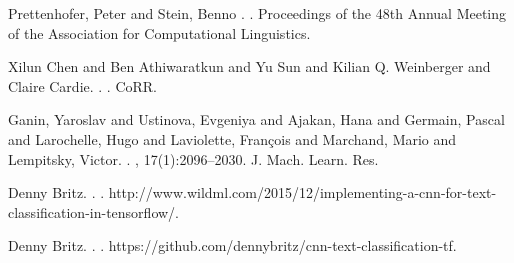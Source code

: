 \documentclass[11pt,a4paper]{article}
\begin{document}
\begin{thebibliography}{}
Prettenhofer, Peter and Stein, Benno
.
.
\newblock Proceedings of the 48th Annual Meeting of the Association for Computational Linguistics.

Xilun Chen and Ben Athiwaratkun and Yu Sun and Kilian Q. Weinberger and Claire Cardie.
.
.
\newblock CoRR.

Ganin, Yaroslav and Ustinova, Evgeniya and Ajakan, Hana and Germain, Pascal and Larochelle, Hugo and Laviolette, Fran\c{c}ois and Marchand, Mario and Lempitsky, Victor.
.
,
  17(1):2096--2030.
\newblock J. Mach. Learn. Res.

Denny Britz.
.
.
\newblock http://www.wildml.com/2015/12/implementing-a-cnn-for-text-classification-in-tensorflow/.

Denny Britz.
.
.
\newblock https://github.com/dennybritz/cnn-text-classification-tf.


\end{thebibliography}
\end{document}
